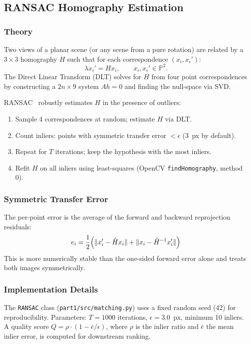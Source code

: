 \documentclass[11pt,letterpaper]{article}
\begin{document}
\subsection{RANSAC Homography Estimation}
\label{sec:ransac}

\subsubsection{Theory}

Two views of a planar scene (or any scene from a pure rotation) are related by a $3\times3$ homography $H$ such that for each correspondence $(x_i, x_i')$:
\[
\lambda x_i' = H x_i, \qquad x_i, x_i' \in \mathbb{P}^2.
\]
The Direct Linear Transform (DLT) solves for $H$ from four point correspondences by constructing a $2n \times 9$ system $Ah = 0$ and finding the null-space via SVD.

RANSAC~\cite{fischler1981} robustly estimates $H$ in the presence of outliers:
\begin{enumerate}[noitemsep]
  \item Sample 4 correspondences at random; estimate $H$ via DLT.
  \item Count inliers: points with symmetric transfer error $< \epsilon$ (3~px by default).
  \item Repeat for $T$ iterations; keep the hypothesis with the most inliers.
  \item Refit $H$ on all inliers using least-squares (OpenCV \texttt{findHomography}, method 0).
\end{enumerate}

\subsubsection{Symmetric Transfer Error}

The per-point error is the average of the forward and backward reprojection residuals:
\[
e_i = \frac{1}{2}\Bigl(\|x_i' - \hat{H} x_i\| + \|x_i - \hat{H}^{-1} x_i'\|\Bigr)
\]
This is more numerically stable than the one-sided forward error alone and treats both images symmetrically.

\subsubsection{Implementation Details}

The \texttt{RANSAC} class (\texttt{part1/src/matching.py}) uses a fixed random seed (42) for reproducibility. Parameters: $T=1000$ iterations, $\epsilon=3.0$~px, minimum 10 inliers. A quality score $Q = \rho \cdot (1 - \bar{e}/\epsilon)$, where $\rho$ is the inlier ratio and $\bar{e}$ the mean inlier error, is computed for downstream ranking.
\end{document}
